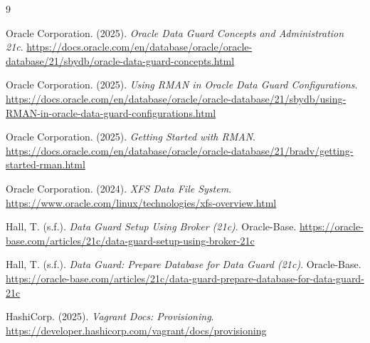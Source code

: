 \documentclass[11pt, a4paper]{report}
\begin{document}
\begin{thebibliography}{9}

Oracle Corporation. (2025). \textit{Oracle Data Guard Concepts and Administration 21c}.
\url{https://docs.oracle.com/en/database/oracle/oracle-database/21/sbydb/oracle-data-guard-concepts.html}

Oracle Corporation. (2025). \textit{Using RMAN in Oracle Data Guard Configurations}.
\url{https://docs.oracle.com/en/database/oracle/oracle-database/21/sbydb/using-RMAN-in-oracle-data-guard-configurations.html}

Oracle Corporation. (2025). \textit{Getting Started with RMAN}.
\url{https://docs.oracle.com/en/database/oracle/oracle-database/21/bradv/getting-started-rman.html}

Oracle Corporation. (2024). \textit{XFS Data File System}.
\url{https://www.oracle.com/linux/technologies/xfs-overview.html}

Hall, T. (s.f.). \textit{Data Guard Setup Using Broker (21c)}. Oracle-Base.
\url{https://oracle-base.com/articles/21c/data-guard-setup-using-broker-21c}

Hall, T. (s.f.). \textit{Data Guard: Prepare Database for Data Guard (21c)}. Oracle-Base.
\url{https://oracle-base.com/articles/21c/data-guard-prepare-database-for-data-guard-21c}

HashiCorp. (2025). \textit{Vagrant Docs: Provisioning}.
\url{https://developer.hashicorp.com/vagrant/docs/provisioning}

\end{thebibliography}
\end{document}
